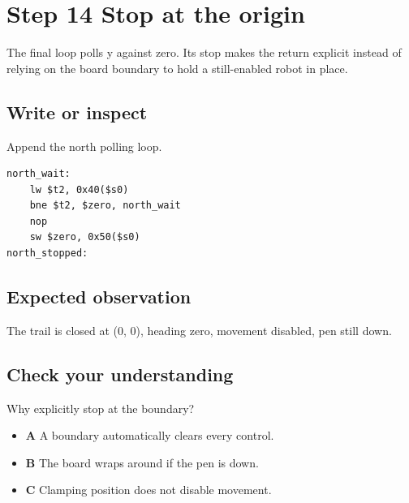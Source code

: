 \section{Step 14 Stop at the
  origin}\label{006-marsbot-square-s14-step-14-stop-at-the-origin}

The final loop polls y against zero. Its stop makes the return explicit
instead of relying on the board boundary to hold a still-enabled robot
in place.

\subsection{Write or
  inspect}\label{006-marsbot-square-s14-write-or-inspect}

Append the north polling loop.

\begin{verbatim}
north_wait:
    lw $t2, 0x40($s0)
    bne $t2, $zero, north_wait
    nop
    sw $zero, 0x50($s0)
north_stopped:
\end{verbatim}

\subsection{Expected
  observation}\label{006-marsbot-square-s14-expected-observation}

The trail is closed at (0, 0), heading zero, movement disabled, pen
still down.

\subsection{Check your
  understanding}\label{006-marsbot-square-s14-check-your-understanding}

Why explicitly stop at the boundary?

\begin{itemize}
  \tightlist
  \item
        \textbf{A} A boundary automatically clears every control.
  \item
        \textbf{B} The board wraps around if the pen is down.
  \item
        \textbf{C} Clamping position does not disable movement.
\end{itemize}
